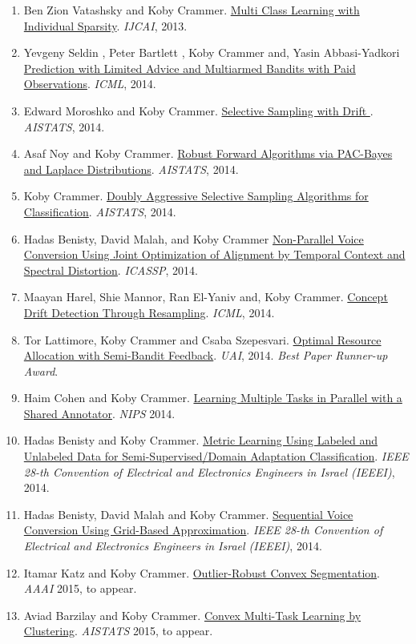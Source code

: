 \documentclass{resume}
\begin{document}
\begin{enumerate}
\item  
Ben Zion Vatashsky and {Koby Crammer}.
\href{}{Multi Class Learning with Individual Sparsity}.
{\em IJCAI}, 2013.

\item Yevgeny  Seldin , Peter  Bartlett , Koby  Crammer and, Yasin  Abbasi-Yadkori
\href{}{Prediction with Limited Advice and Multiarmed Bandits with Paid Observations}.
{\em ICML}, 2014.

\item Edward Moroshko and {Koby Crammer}.
\href{}{Selective Sampling with Drift }.
{\em AISTATS}, 2014.

\item Asaf Noy and {Koby  Crammer}.
\href{}{Robust Forward Algorithms via PAC-Bayes and Laplace Distributions}.
{\em AISTATS}, 2014.

\item {Koby  Crammer}.
\href{}{Doubly Aggressive Selective Sampling Algorithms for Classification}.
{\em AISTATS}, 2014.

\item Hadas Benisty, David Malah, and {Koby Crammer}
\href{}{Non-Parallel Voice Conversion Using Joint Optimization of Alignment 
by Temporal Context and Spectral Distortion}. 
{\em ICASSP}, 2014.

\item Maayan Harel, Shie Mannor, Ran El-Yaniv and, {Koby Crammer}. 
\href{}{Concept Drift Detection Through Resampling}.
{\em ICML}, 2014.

\item Tor Lattimore, {Koby Crammer} and Csaba Szepesvari.
\href{}{Optimal Resource Allocation with Semi-Bandit Feedback}.
{\em UAI}, 2014. {\em Best Paper Runner-up Award}.

\item Haim Cohen and {Koby Crammer}.
 \href{}{Learning Multiple Tasks in Parallel with a Shared
   Annotator}. 
{\em NIPS} 2014.


\item Hadas Benisty and {Koby Crammer}.
\href{}{Metric Learning Using Labeled and Unlabeled Data for Semi-Supervised/Domain
Adaptation Classification}.
{\em IEEE 28-th Convention of Electrical and Electronics
  Engineers in Israel (IEEEI)}, 2014.


\item Hadas Benisty, David Malah and {Koby Crammer}.
\href{}{Sequential Voice Conversion Using Grid-Based Approximation}.
{\em IEEE 28-th Convention of Electrical and Electronics
  Engineers in Israel (IEEEI)}, 2014.


\item Itamar Katz and {Koby Crammer}.
 \href{}{Outlier-Robust Convex Segmentation}. 
{\em AAAI} 2015, to appear.


\item Aviad Barzilay and {Koby Crammer}.
\href{}{Convex Multi-Task Learning by Clustering}. 
{\em AISTATS} 2015, to appear.


\end{enumerate}
\end{document}
